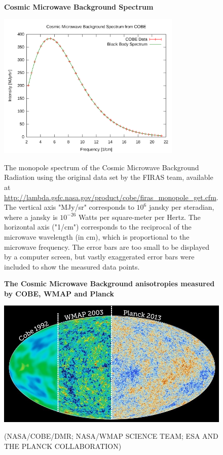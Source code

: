 \documentclass{article}
\begin{document}
\begin{figure}[h]
\centering
    \textbf{Cosmic Microwave Background  Spectrum}\par\medskip
\centering
   {\includegraphics[height=7cm]{blackbody}}
\caption{The monopole spectrum of the Cosmic Microwave Background Radiation using the original data set by the FIRAS team, available at \url{http://lambda.gsfc.nasa.gov/product/cobe/firas_monopole_get.cfm}. The vertical axis "MJy/sr" corresponds to $10^6$ jansky per steradian, where a jansky is $10^{-26}$ Watts per square-meter per Hertz. The horizontal axis ("1/cm") corresponds to the reciprocal of the microwave wavelength (in cm), which is proportional to the microwave frequency. The error bars are too small to be displayed by a computer screen, but vastly exaggerated error bars were included to show the measured data points.}
\label{cobe_blackbody}
\end{figure}


\begin{figure}[h]
\centering
    \textbf{The Cosmic Microwave Background anisotropies measured by COBE, WMAP and Planck}\par\medskip
\centering
   {\includegraphics[width=.65\textwidth]{cmb1.jpg}}


\caption{(NASA/COBE/DMR; NASA/WMAP SCIENCE TEAM; ESA AND THE PLANCK COLLABORATION)}
\label{cobe_wmap_planck}
\end{figure}
\end{document}
